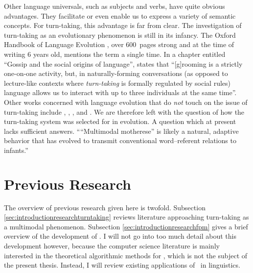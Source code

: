 Other language universals, such as subjects and verbs, have quite obvious advantages.
They facilitate or even enable us to express a variety of semantic concepts.
For turn-taking, this advantage is far from clear.
The investigation of turn-taking as an evolutionary phenomenon is still in its infancy.
The Oxford Handbook of Language Evolution \citep{tallerman_oxford_2012}, over 600~pages strong and at the time of writing 6 years old, mentions the term a single time.
In a chapter entitled ``Gossip and the social origins of language'', \citet[, emphasis mine]{dunbar_gossip_2012} states that ``[g]rooming is a strictly one-on-one activity, but, in naturally-forming conversations (as opposed to lecture-like contexts where \emph{turn-taking} is formally regulated by social rules) language allows us to interact with up to three individuals at the same time''.
Other works concerned with language evolution that do \emph{not} touch on the issue of turn-taking include \citet{berwick_why_2016}, \citet{bolhuis_birdsong_2013}, \citet{friederici_language_2017}, and \citet{jenkins_biolinguistics_2000}.
We are therefore left with the question of how the turn-taking system was selected for in evolution.
A question which at present lacks sufficient answers.
``“Multimodal motherese” is likely a natural, adaptive behavior that has evolved to transmit conventional word–referent relations to infants.'' \citep[]{gogate_study_2000}




\section{Previous Research}
\label{sec:introres}
The overview of previous research given here is twofold. Subsection \ref{sec:introductionresearchturntaking} reviews literature approaching turn-taking as a multimodal phenomenon.
Subsection \ref{sec:introductionresearchfpm} gives a brief overview of the development of \fpmlower.
I will not go into too much detail about this development however, because the computer science literature is mainly interested in the theoretical algorithmic methods for \fpmlower, which is not the subject of the present thesis.
Instead, I will review existing applications of \fpmlower\ in linguistics.


